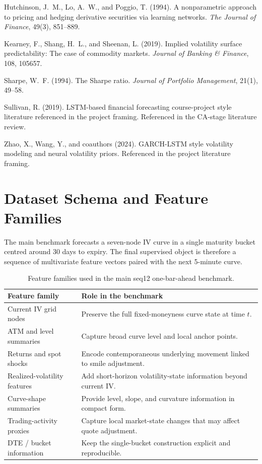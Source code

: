 \documentclass[12pt]{report}
\begin{document}
\begin{thebibliography}{99}
Hutchinson, J.~M., Lo, A.~W., and Poggio, T. (1994).
\newblock A nonparametric approach to pricing and hedging derivative securities via learning networks.
\newblock \emph{The Journal of Finance}, 49(3), 851--889.

Kearney, F., Shang, H.~L., and Sheenan, L. (2019).
\newblock Implied volatility surface predictability: The case of commodity markets.
\newblock \emph{Journal of Banking \& Finance}, 108, 105657.

Sharpe, W.~F. (1994).
\newblock The Sharpe ratio.
\newblock \emph{Journal of Portfolio Management}, 21(1), 49--58.

Sullivan, R. (2019).
\newblock LSTM-based financial forecasting course-project style literature referenced in the project framing.
\newblock Referenced in the CA-stage literature review.

Zhao, X., Wang, Y., and coauthors (2024).
\newblock GARCH-LSTM style volatility modeling and neural volatility priors.
\newblock Referenced in the project literature framing.

\end{thebibliography}

\appendix

\chapter{Dataset Schema and Feature Families}
The main benchmark forecasts a seven-node IV curve in a single maturity bucket centred around 30 days to expiry. The final supervised object is therefore a sequence of multivariate feature vectors paired with the next 5-minute curve.

\begin{table}[H]
\centering
\caption{Feature families used in the main seq12 one-bar-ahead benchmark.}
\footnotesize
\renewcommand{\arraystretch}{1.15}
\begin{tabularx}{\textwidth}{@{}lY@{}}
\toprule
\textbf{Feature family} & \textbf{Role in the benchmark} \\
\midrule
Current IV grid nodes & Preserve the full fixed-moneyness curve state at time \(t\). \\
ATM and level summaries & Capture broad curve level and local anchor points. \\
Returns and spot shocks & Encode contemporaneous underlying movement linked to smile adjustment. \\
Realized-volatility features & Add short-horizon volatility-state information beyond current IV. \\
Curve-shape summaries & Provide level, slope, and curvature information in compact form. \\
Trading-activity proxies & Capture local market-state changes that may affect quote adjustment. \\
DTE / bucket information & Keep the single-bucket construction explicit and reproducible. \\
\bottomrule
\end{tabularx}
\end{table}
\end{document}
